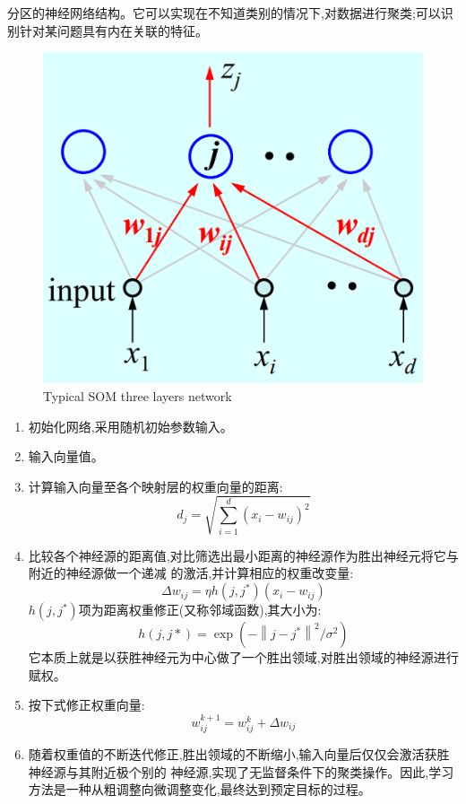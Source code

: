 \documentclass[homework]{IEEEtran}
\begin{document}
\begin{CJK}{UTF8}{gkai}
分区的神经网络结构。它可以实现在不知道类别的情况下,对数据进行聚类;可以识别针对某问题具有内在关联的特征。\par
\begin{figure}[htb]
\centerline{\includegraphics{Images/fig2.png}}
\caption{Typical SOM three layers network}
\label{fig2}
\end{figure}
\begin{enumerate}
\item 初始化网络,采用随机初始参数输入。
\item 输入向量值。
\item 计算输入向量至各个映射层的权重向量的距离:
$$
d_j = \sqrt{\sum_{i=1}^{d}(x_i-w_{ij})^{2}}
$$
\item 比较各个神经源的距离值,对比筛选出最小距离的神经源作为胜出神经元将它与附近的神经源做一个递减
的激活,并计算相应的权重改变量:
$$
\Delta w_{ij} = \eta h(j,j^*)(x_i - w_{ij})$$ 
$h(j,j^*)$项为距离权重修正(又称邻域函数),其大小为:
$$
h(j, j *)=\exp \left(-\left\|j-j^{*}\right\|^{2} / \sigma^{2}\right)
$$
它本质上就是以获胜神经元为中心做了一个胜出领域,对胜出领域的神经源进行赋权。
\item 按下式修正权重向量:
$$
w_{ij}^{k+1} = w_{ij}^{k} + \Delta w_{ij}
$$
\item 随着权重值的不断迭代修正,胜出领域的不断缩小,输入向量后仅仅会激活获胜神经源与其附近极个别的
神经源,实现了无监督条件下的聚类操作。因此,学习方法是一种从粗调整向微调整变化,最终达到预定目标的过程。
\end{enumerate}
\end{CJK}
\end{document}
